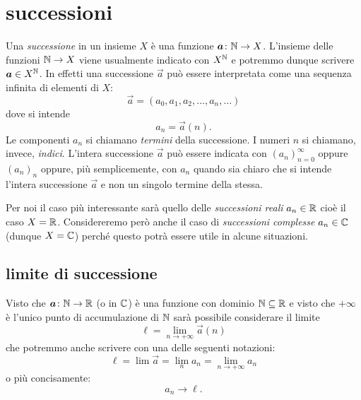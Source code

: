 \section{successioni}
\label{sec:successioni}

Una \emph{successione}%
%
 in un insieme $X$ è una
funzione $\boldsymbol a\colon {\mathbb N} \to X$.
L'insieme delle funzioni ${\mathbb N} \to X$ viene usualmente indicato
con $X^{\mathbb N}$ e potremmo dunque scrivere $\boldsymbol a \in X^{\mathbb N}$. 
In effetti una successione $\vec a$ può essere interpretata
come una sequenza infinita di elementi di $X$:
\[
  \vec a = (a_0, a_1, a_2, \dots, a_n, \dots )
\]
dove si intende
\[
   a_n = \vec a(n).
\]
Le componenti $a_n$ si chiamano \emph{termini} della successione.
I numeri $n$ si chiamano, invece, \emph{indici}.
L'intera
successione $\vec a$ può essere indicata con $(a_n)_{n=0}^\infty$
oppure $(a_n)_n$ oppure,
più semplicemente, con $a_n$ quando sia chiaro che si intende l'intera
successione $\vec a$ e non un singolo termine della stessa.%

Per noi il caso più interessante sarà quello delle \emph{successioni reali}
$a_n\in {\mathbb R}$ cioè il caso $X={\mathbb R}$. Considereremo però anche il caso di
\emph{successioni complesse} $a_n\in {\mathbb C}$ (dunque $X={\mathbb C}$) perché questo
potrà essere utile in alcune situazioni.%

\subsection{limite di successione}

Visto che $\boldsymbol a \colon {\mathbb N}\to{\mathbb R}$ (o in ${\mathbb C}$) è una funzione 
con dominio ${\mathbb N}\subseteq {\mathbb R}$ 
e visto che $+\infty$ è l'unico punto di accumulazione di ${\mathbb N}$ 
sarà possibile considerare il limite
\[
  \ell = \lim_{n\to +\infty} \vec a(n)
\]
che potremmo anche scrivere con una delle seguenti notazioni:
\[
\ell = \lim \vec a = \lim_n a_n = \lim_{n\to +\infty} a_n
\]
o più concisamente:
\[
  a_n \to \ell. 
\]

